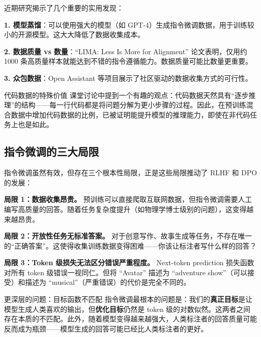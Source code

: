 \documentclass[a4paper]{article}
\begin{document}
近期研究揭示了几个重要的实用发现：





\textbf{1. 模型蒸馏}：可以使用强大的模型（如 GPT-4）生成指令微调数据，用于训练较小的开源模型。这大大降低了数据收集成本。

\textbf{2. 数据质量 vs 数量}：``LIMA: Less Is More for Alignment'' 论文表明，仅用约 1000 条高质量样本就能达到不错的指令遵循能力。数据质量可能比数量更重要。

\textbf{3. 众包数据}：Open Assistant 等项目展示了社区驱动的数据收集方式的可行性。

\begin{knowledgebox}{代码数据的特殊价值}
课堂讨论中提到一个有趣的观点：代码数据天然具有``逐步推理''的结构——每一行代码都是将问题分解为更小步骤的过程。因此，在预训练混合数据中增加代码数据的比例，已被证明能提升模型的推理能力，即使在非代码任务上也是如此。
\end{knowledgebox}

\subsection{指令微调的三大局限}

指令微调虽然有效，但存在三个根本性局限，正是这些局限推动了 RLHF 和 DPO 的发展：





\textbf{局限 1：数据收集昂贵。} 预训练可以直接爬取互联网数据，但指令微调需要人工编写高质量的回答。随着任务复杂度提升（如物理学博士级别的问题），这变得越来越昂贵。

\textbf{局限 2：开放性任务无标准答案。} 对于创意写作、故事生成等任务，不存在唯一的``正确答案''。这使得收集训练数据变得困难——你该让标注者写什么样的回答？

\textbf{局限 3：Token 级损失无法区分错误严重程度。} Next-token prediction 损失函数对所有 token 级错误一视同仁。但将 ``Avatar'' 描述为 ``adventure show''（可以接受）和描述为 ``musical''（严重错误）的代价是完全不同的。





\begin{warningbox}{更深层的问题：目标函数不匹配}
指令微调最根本的问题是：我们的\textbf{真正目标}是让模型生成人类喜欢的输出，但\textbf{优化目标}仍然是 token 级的对数似然。这两者之间存在本质的不匹配。此外，随着模型变得越来越强大，人类标注者的回答质量可能反而成为瓶颈——模型生成的回答可能已经比人类标注者的更好。
\end{warningbox}
\end{document}
